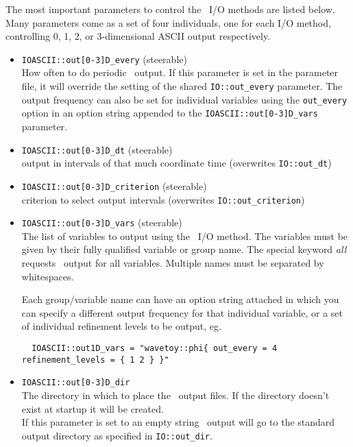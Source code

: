 \documentclass{article}
\begin{document}
The most important parameters to control the \ThisThorn\ I/O methods are listed
below. Many parameters come as a set of four individuals, one for each
I/O method, controlling 0, 1, 2, or 3-dimensional ASCII output respectively.

\begin{itemize}
  \item {\tt IOASCII::out[0-3]D\_every} (steerable)\\
        How often to do periodic \ThisThorn\ output. If this parameter is set
        in the parameter file, it will override the setting of the shared
        {\tt IO::out\_every} parameter. The output frequency can also be set
        for individual variables using the {\tt out\_every} option in an
        option string appended to the {\tt IOASCII::out[0-3]D\_vars} parameter.
  
  \item {\tt IOASCII::out[0-3]D\_dt} (steerable)\\
        output in intervals of that much coordinate time (overwrites
        {\tt IO::out\_dt})
  
  \item {\tt IOASCII::out[0-3]D\_criterion} (steerable)\\
        criterion to select output intervals (overwrites
        {\tt IO::out\_criterion})
  
  \item {\tt IOASCII::out[0-3]D\_vars} (steerable)\\ 
        The list of variables to output using the \ThisThorn\ I/O method.
        The variables must be given by their fully qualified variable or group
        name. The special keyword {\it all} requests \ThisThorn\ output for
        all variables. Multiple names must be separated by whitespaces.

        Each group/variable name can have an option string attached in which you
        can specify a different output frequency for that individual variable,
        or a set of individual refinement levels to be output, eg.
\begin{verbatim}
  IOASCII::out1D_vars = "wavetoy::phi{ out_every = 4 refinement_levels = { 1 2 } }"
\end{verbatim}
  
  \item {\tt IOASCII::out[0-3]D\_dir}\\
        The directory in which to place the \ThisThorn\ output files.
        If the directory doesn't exist at startup it will be created.\\
        If this parameter is set to an empty string \ThisThorn\ output will go
        to the standard output directory as specified in {\tt IO::out\_dir}.
  

\end{itemize}
\end{document}
